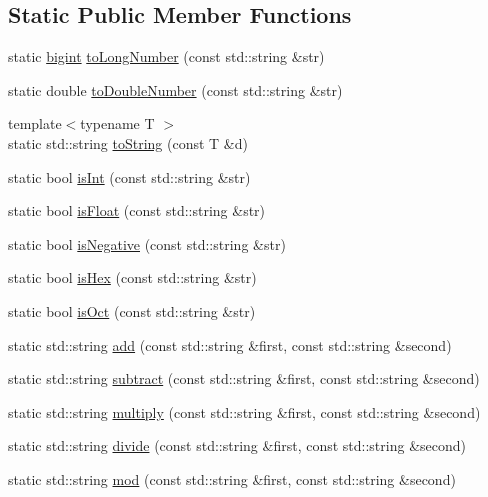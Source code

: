 \subsection*{Static Public Member Functions}
\begin{DoxyCompactItemize}
\item 
static \hyperlink{class_math_lib_aea370b3be964c5704b6244d757fcac99}{bigint} \hyperlink{class_math_lib_a9262074fa86e11ca5be7b95c0dec115a}{to\-Long\-Number} (const std\-::string \&str)
\item 
static double \hyperlink{class_math_lib_ac16cb112f944e792301b0e0f469b7aed}{to\-Double\-Number} (const std\-::string \&str)
\item 
{\footnotesize template$<$typename T $>$ }\\static std\-::string \hyperlink{class_math_lib_af75d9066b83ccc19dfe49ab24fde205d}{to\-String} (const T \&d)
\item 
static bool \hyperlink{class_math_lib_ab723cea60e26a88a907593489716092d}{is\-Int} (const std\-::string \&str)
\item 
static bool \hyperlink{class_math_lib_a905dc4e23cb3699c57e6a955d91cc601}{is\-Float} (const std\-::string \&str)
\item 
static bool \hyperlink{class_math_lib_aa3ec1e567593dd04565c333f93f2af37}{is\-Negative} (const std\-::string \&str)
\item 
static bool \hyperlink{class_math_lib_acf933c4bf15ed7b4edcd69a62b91acf9}{is\-Hex} (const std\-::string \&str)
\item 
static bool \hyperlink{class_math_lib_a435b27de944ed1382ac812317e8775fb}{is\-Oct} (const std\-::string \&str)
\item 
static std\-::string \hyperlink{class_math_lib_a9e98cd7250bf39c135f1c077c15932fe}{add} (const std\-::string \&first, const std\-::string \&second)
\item 
static std\-::string \hyperlink{class_math_lib_a7a05912a9967367eab3dc08c22a1cf68}{subtract} (const std\-::string \&first, const std\-::string \&second)
\item 
static std\-::string \hyperlink{class_math_lib_ab9ab2c1e215fc1271713b0ccd7be05d3}{multiply} (const std\-::string \&first, const std\-::string \&second)
\item 
static std\-::string \hyperlink{class_math_lib_a2f951ffa2929db217c4debd529ec9357}{divide} (const std\-::string \&first, const std\-::string \&second)
\item 
static std\-::string \hyperlink{class_math_lib_a96054e8ef9c7b8f945054c2b18d8a40e}{mod} (const std\-::string \&first, const std\-::string \&second)

\end{DoxyCompactItemize}
